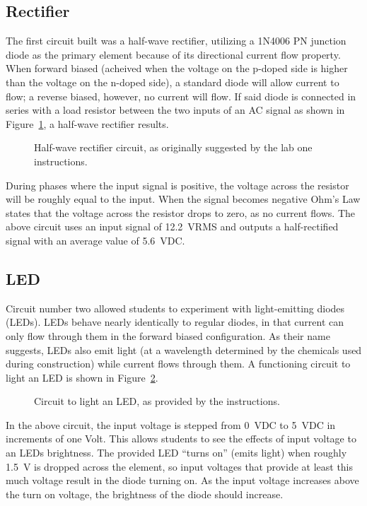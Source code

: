 \subsection{Rectifier}
The first circuit built was a half-wave rectifier, utilizing a 1N4006 PN
junction diode as the primary element because of its directional current flow
property.  When forward biased (acheived when the voltage on the p-doped side
is higher than the voltage on the n-doped side), a standard diode will allow
current to flow; a reverse biased, however, no current will flow.  If said
diode is connected in series with a load resistor between the two inputs of an
AC signal as shown in Figure~\ref{fig:schem1}, a half-wave rectifier results.
%
\begin{figure}[H]
	\centering
	
	\caption{Half-wave rectifier circuit, as originally suggested by the lab one instructions.}
	\label{fig:schem1}
\end{figure}
%
During phases where the input signal is positive, the voltage across the
resistor will be roughly equal to the input.  When the signal becomes negative
Ohm's Law states that the voltage across the resistor drops to zero, as no
current flows.  The above circuit uses an input signal of \SI{12.2}{\volt}RMS
and outputs a half-rectified signal with an average value of \SI{5.6}{\volt}DC.

\subsection{LED}
Circuit number two allowed students to experiment with light-emitting diodes
(LEDs).  LEDs behave nearly identically to regular diodes, in that current can
only flow through them in the forward biased configuration.  As their name
suggests, LEDs also emit light (at a wavelength determined by the chemicals
used during construction) while current flows through them.  A functioning
circuit to light an LED is shown in Figure~\ref{fig:schem2}.
%
\begin{figure}[H]
	\centering
	
	\caption{Circuit to light an LED, as provided by the instructions.}
	\label{fig:schem2}
\end{figure}
%
In the above circuit, the input voltage is stepped from \SI{0}{\volt}DC to
\SI{5}{\volt}DC in increments of one Volt.  This allows students to see the
effects of input voltage to an LEDs brightness.  The provided LED ``turns on''
(emits light) when roughly \SI{1.5}{\volt} is dropped across the element, so
input voltages that provide at least this much voltage result in the diode
turning on.  As the input voltage increases above the turn on voltage, the
brightness of the diode should increase.



\begin{figure}[H]

\end{figure}

\begin{figure}[H]

\end{figure}


